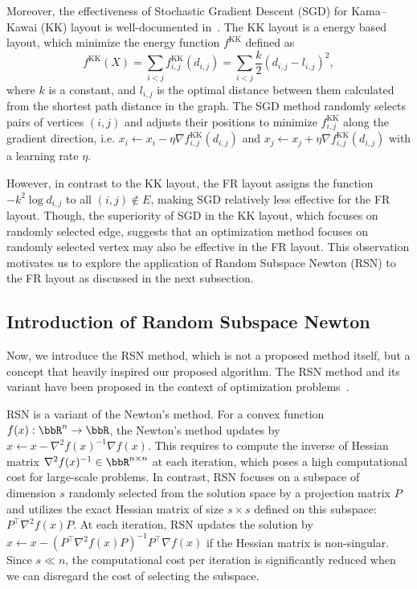 \documentclass[dvipdfmx,journal]{IEEEtran}
\begin{document}
Moreover, the effectiveness of Stochastic Gradient Descent (SGD) for Kama--Kawai (KK) layout is well-documented in~\cite{8419285}.
The KK layout is a energy based layout, which minimize the energy function $f^{\mathrm{KK}}$ defined as
\begin{equation*}
  f^{\mathrm{KK}}(X) = \sum_{i<j} f^{\mathrm{KK}}_{i,j}(d_{i,j}) = \sum_{i<j} \frac{k}{2}(d_{i,j}-l_{i,j})^2,
\end{equation*}
where $k$ is a constant, and $l_{i,j}$ is the optimal distance between them calculated from the shortest path distance in the graph.
The SGD method randomly selects pairs of vertices $(i,j)$ and adjusts their positions to minimize $f^{\mathrm{KK}}_{i,j}$ along the gradient direction, i.e. $x_i \gets x_i - \eta \nabla f^{\mathrm{KK}}_{i,j}(d_{i,j})$ and $x_j \gets x_j + \eta \nabla f^{\mathrm{KK}}_{i,j}(d_{i,j})$ with a learning rate $\eta$.

However, in contrast to the KK layout, the FR layout assigns the function $-k^2\log{d_{i,j}}$ to all $(i,j) \notin E$, making SGD relatively less effective for the FR layout.
Though, the superiority of SGD in the KK layout, which focuses on randomly selected edge, suggests that an optimization method focuses on randomly selected vertex may also be effective in the FR layout.
This observation motivates us to explore the application of Random Subspace Newton (RSN) to the FR layout as discussed in the next subsection.

\subsection{Introduction of Random Subspace Newton}\label{ssec:introRSN}

Now, we introduce the RSN method, which is not a proposed method itself, but a concept that heavily inspired our proposed algorithm.
The RSN method and its variant have been proposed in the context of optimization problems~\cite{NEURIPS2019_bc6dc48b,fujiRandomizedSubspaceRegularized2022,cartisRandomisedSubspaceMethods2022,higuchiFastConvergenceSecondOrder2024}.

RSN is a variant of the Newton's method. For a convex function $f(x): \bbR^n \to \bbR$, the Newton's method updates by $x \gets x - \nabla^2 f(x)^{-1} \nabla f(x)$.
This requires to compute the inverse of Hessian matrix $\nabla^2 f(x)^{-1} \in \bbR^{n \times n}$ at each iteration, which poses a high computational cost for large-scale problems.
In contrast, RSN focuses on a subspace of dimension $s$ randomly selected from the solution space by a projection matrix $P$ and utilizes the exact Hessian matrix of size $s \times s$ defined on this subspace: $P^\top \nabla^2 f(x) P$.
At each iteration, RSN updates the solution by $x \gets x - (P^\top \nabla^2 f(x) P)^{-1} P^\top \nabla f(x)$ if the Hessian matrix is non-singular.
Since $s \ll n$, the computational cost per iteration is significantly reduced when we can disregard the cost of selecting the subspace.
\end{document}
